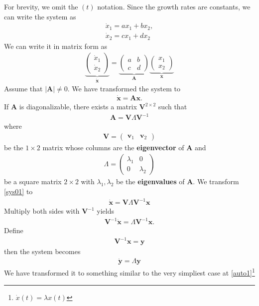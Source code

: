 \documentclass[11pt,a4paper]{book}
\theoremstyle{definition}\newtheorem{definition}{Definition}
\theoremstyle{definition}\newtheorem{fact}{Fact}
\theoremstyle{definition}\newtheorem{remark}{Remark}
\theoremstyle{definition}\newtheorem{ex}{Ex.}
\theoremstyle{definition}\newtheorem{project}{Project}
\theoremstyle{definition}\newtheorem{problem}{Problem}
\theoremstyle{definition}\newtheorem{example}{Example}
\numberwithin{theorem}{section}
\numberwithin{corollary}{chapter}
\numberwithin{assumption}{chapter}
\numberwithin{definition}{chapter}
\numberwithin{prop}{chapter}
\numberwithin{notation}{chapter}
\numberwithin{problem}{chapter}
\numberwithin{example}{chapter}
\numberwithin{fact}{chapter}
\numberwithin{ex}{chapter}
\def\A{\mathbf A}
\def\v{\mathbf v}
\def\x{\mathbf x}
\def\y{\mathbf y}
\def\V{\mathbf V}
\begin{document}
	For brevity, we omit the $(t)$ notation. Since the growth rates are constants, we can write the system as
	\begin{align*}
		\dot{x}_1 = a x_1 + b x_2, \\
		\dot{x}_2 = c x_1 + d x_2
	\end{align*}
	We can write it in matrix form as
	\begin{align*}
		\underbrace{\begin{pmatrix}
			\dot{x}_1 \\ \dot{x}_2
		\end{pmatrix}}_{\dot{\x}}
		= 
		\underbrace{\begin{pmatrix}
			a & b \\ c & d
		\end{pmatrix}}_{\A}
		\underbrace{\begin{pmatrix}
			x_1 \\ x_2
		\end{pmatrix}}_{\x}
	\end{align*}
	Assume that $|\A| \neq 0$. We have transformed the system to
	\begin{align}
		\dot{\x} = \A \x. \label{sys01}
	\end{align}
	If $\A$ is diagonalizable, there exists a matrix $\V^{2\times 2}$ such that
	\begin{align*}
		\A = \V \Lambda \V^{-1}
	\end{align*}
	where 
	\begin{align*}
		\V = \begin{pmatrix}
			\v_1 & \v_2
		\end{pmatrix}
	\end{align*}
	be the $1\times 2$ matrix whose columns are the \textbf{eigenvector} of $\A$ and
	\begin{align*}
		\Lambda = \begin{pmatrix}
			\lambda_1 & 0 \\
			0 & \lambda_2
		\end{pmatrix}
	\end{align*}
	be a square matrix $2\times 2$ with $\lambda_1, \lambda_2$ be the \textbf{eigenvalues} of $\A$. We transform \eqref{sys01} to
	\begin{align*}
		\dot{\x} = \V \Lambda \V^{-1} \x 
	\end{align*} 
	Multiply both sides with $\V^{-1}$ yields
	\begin{align*}
		\V^{-1} \dot{\x} = \Lambda \V^{-1} \x.
	\end{align*}
	Define
	\begin{align*}
		\V^{-1} \x = \y 
	\end{align*}
	then the system becomes
	\begin{align}
		\dot{\y} = \Lambda \y  \label{keysys}
	\end{align}
	We have transformed it to something similar to the very simpliest case at \eqref{auto1}\footnote{$\dot{x}(t) = \lambda x(t)$}
	
\end{document}
